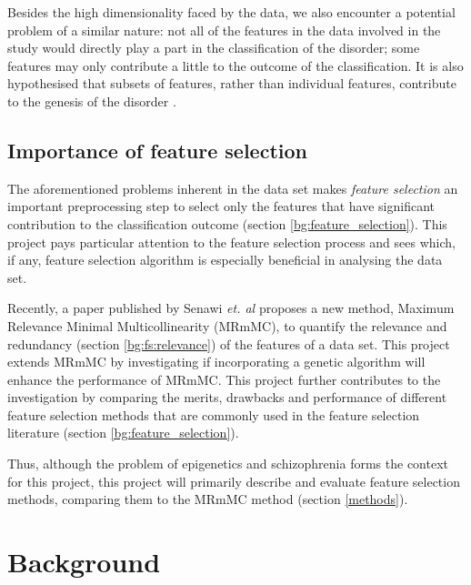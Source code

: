 \documentclass[12pt, twoside, a4paper]{report}
\begin{document}
Besides the high dimensionality faced by the data, we also encounter a  potential problem of a similar nature: not all of the features in the data involved in the study would directly play a part in the classification of the disorder; some features may only contribute a little to the outcome of the classification. It is also hypothesised that subsets of features, rather than individual features, contribute to the genesis of the disorder \cite{RefWorks:10}.


\section{Importance of feature selection}
The aforementioned problems inherent in the data set makes \textit{feature selection} an important preprocessing step to select only the features that have significant contribution to the classification outcome (section \ref{bg:feature_selection}). This project pays particular attention to the feature selection process and sees which, if any, feature selection algorithm is especially beneficial in analysing the data set.

Recently, a paper published by Senawi \textit{et. al} \cite{RefWorks:187} proposes a new method, Maximum Relevance Minimal Multicollinearity (MRmMC), to quantify the relevance and redundancy (section \ref{bg:fs:relevance}) of the features of a data set.
This project extends MRmMC by investigating if incorporating a genetic algorithm will enhance the performance of MRmMC. This project further contributes to the investigation by comparing the merits, drawbacks and performance of different feature selection methods that are commonly used in the feature selection literature (section \ref{bg:feature_selection}).

Thus, although the problem of epigenetics and schizophrenia forms the context for this project, this project will primarily describe and evaluate feature selection methods, comparing them to the MRmMC method (section \ref{methods}).



\chapter{Background}
\end{document}
